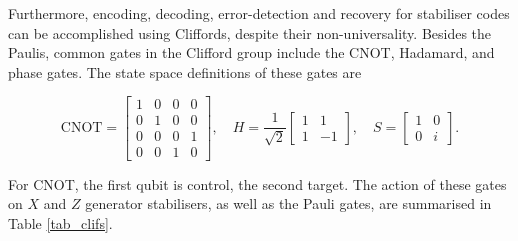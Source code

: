 \documentclass[10pt]{article}
\renewcommand{\arraystretch}{1.5}
\begin{document}
Furthermore, encoding, decoding, error-detection and recovery for stabiliser codes can be accomplished using Cliffords, despite their non-universality. Besides the Paulis, common gates in the Clifford group include the CNOT, Hadamard, and phase gates. The state space definitions of these gates are

\renewcommand{\arraystretch}{1}
\begin{equation}
\text{CNOT} = \begin{bmatrix} 1 & 0 & 0 & 0 \\ 0 & 1 & 0 & 0 \\ 0 & 0 & 0 & 1 \\ 0 & 0 & 1 & 0 \end{bmatrix},
\quad
H = \frac{1}{\sqrt{2}} \begin{bmatrix} 1 & 1 \\ 1 & -1 \end{bmatrix},
\quad
S =  \begin{bmatrix} 1 & 0 \\ 0 & i \end{bmatrix}.
\end{equation}
\renewcommand{\arraystretch}{1.5}

For CNOT, the first qubit is control, the second target. The action of these gates on $X$ and $Z$ generator stabilisers, as well as the Pauli gates, are summarised in Table \ref{tab_clifs}.

\begin{table}
\centering
{}
\caption{Action of common Clifford gates on basis stabilisers $X$ and $Z$. Subscripts $C$ and $T$ denote the control and target qubits respectively for the CNOT gate.}
\label{tab_clifs}
\end{table}
\end{document}
